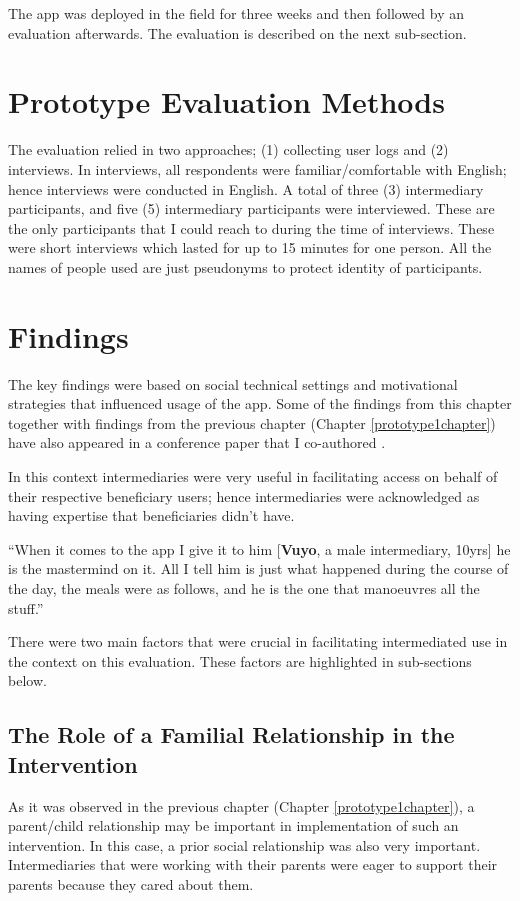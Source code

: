 The app was deployed in the field for three weeks and then followed by an evaluation afterwards. The evaluation is described on the next sub-section.
\section{Prototype Evaluation Methods}
The evaluation relied in two approaches; (1) collecting user logs and (2) interviews. In interviews, all respondents were familiar/comfortable with English; hence interviews were conducted in English. A total of three (3) intermediary participants, and five (5) intermediary participants were interviewed. These are the only participants that I could reach to during the time of interviews. These were short interviews which lasted  for up to 15 minutes for one person. All the names of people used are just pseudonyms to protect identity of participants. 
\section{Findings}
The key findings were based on social technical settings and motivational strategies that influenced usage of the app. Some of the findings from this chapter together with findings from the previous chapter (Chapter \ref{prototype1chapter}) have also appeared in a conference paper that I co-authored \citep{katule2016leveraging}.

In this context intermediaries were very useful in facilitating access on behalf of their respective beneficiary users; hence intermediaries were acknowledged as having expertise that beneficiaries didn't have. 

 {``When it comes to the app I give it to him [\textbf{Vuyo}, a male intermediary, 10yrs] he is the mastermind on it. All I tell him is just what happened during the course of the day, the meals were as follows, and he is the one that manoeuvres all the stuff.''} 

There were two main factors that were crucial in facilitating intermediated use in the context on this evaluation. These factors are highlighted in sub-sections below.

\subsection{The Role of a Familial Relationship in the Intervention}
As it was observed in the previous chapter (Chapter \ref{prototype1chapter}), a parent/child relationship may be important in implementation of such an intervention. In this case, a prior social relationship was also very important. Intermediaries that were working with their parents were eager to support their parents because they cared about them. 

